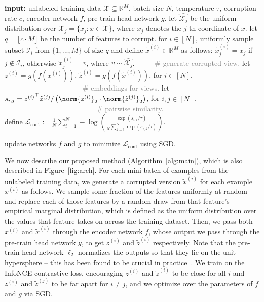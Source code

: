 \begin{algorithm}[!t]
\caption{\label{alg:main} \textsc{Scarf} pre-training algorithm.}
\begin{algorithmic}[1]
    \STATE \textbf{input:} unlabeled training data $\mathcal{X} \subseteq \mathbb{R}^M$, batch size $N$, temperature $\tau$, corruption rate $c$, encoder network $f$, pre-train head network $g$.
    \STATE let $\widehat{\mathcal{X}_j}$ be the uniform distribution over $\mathcal{X}_j = \{x_j : x \in \mathcal{X}\}$, where $x_j$ denotes the $j$-th coordinate of $x$.
    \STATE let $q = \lfloor c\cdot  M\rfloor$ be the number of features to corrupt.
    \STATE for $i \in [N]$, uniformly sample subset $\mathcal{I}_i$ from $\{1,...,M\}$ of size $q$ and define  $\tilde{x}^{(i)} \in \mathbb{R}^M$ as follows:
    $\tilde{x}^{(i)}_j = x_j$ if $j \not\in \mathcal{I}_i$, otherwise $\tilde{x}^{(i)}_j = v$, where $v \sim \widehat{\mathcal{X}_j}$.  \textcolor{gray}{~~~~~\# generate corrupted view.}
    \STATE let $z^{(i)} = g\left(f\left(x^{(i)}\right)\right)$, $\tilde{z}^{(i)} = g\left(f\left(\tilde{x}^{(i)}\right)\right)$, for $i \in [N]$.  \textcolor{gray}{~~~~~~~~~~~~~~~~~~~~~~\# embeddings for views.}    
    \STATE let $s_{i,j} = {z^{(i)}}^\top \tilde{z}^{(j)} / \left(\norm{z^{(i)}}_2 \cdot \norm{\tilde{z}^{(j)}}_2\right)$, for $i, j \in [N]$. \textcolor{gray}{~~~~~~~~~~~~~~~~~~~~~~~~~~\# pairwise similarity.}\\
    \STATE define $\mathcal{L}_{\text{cont}} := \frac{1}{N} \sum_{i=1}^N -\log\left( \frac{\exp(s_{i,i}/\tau)}{\frac{1}{N}\sum_{k=1}^{N} \exp(s_{i, k}/\tau)}\right)$.

    \STATE update networks $f$ and $g$ to minimize $\mathcal{L}_{\text{cont}}$ using SGD.
    \ENDFOR
\end{algorithmic}
\end{algorithm}

We now describe our proposed method (Algorithm~\ref{alg:main}), which is also described in Figure~\ref{fig:arch}. For each mini-batch of examples from the unlabeled training data, we generate a corrupted version $\tilde{x}^{(i)}$ for each example $x^{(i)}$ as follows. We sample some fraction of the features uniformly at random and replace each of those features by a random draw from that feature's empirical marginal distribution, which is defined as the uniform distribution over the values that feature takes on across the training dataset. Then, we pass both $x^{(i)}$ and $\tilde{x}^{(i)}$ through the encoder network $f$, whose output we pass through the pre-train head network $g$, to get $z^{(i)}$ and $\tilde{z}^{(i)}$ respectively. Note that the pre-train head network $\ell_2$-normalizes the outputs so that they lie on the unit hypersphere -- this has been found to be crucial in practice~\citep{chen2020simple,wang2020understanding}. We train on the InfoNCE contrastive loss, encouraging $z^{(i)}$ and $\tilde{z}^{(i)}$ to be close for all $i$ and $z^{(i)}$ and $\tilde{z}^{(j)}$ to be far apart for $i\neq j$, and we optimize over the parameters of $f$ and $g$ via SGD. 

